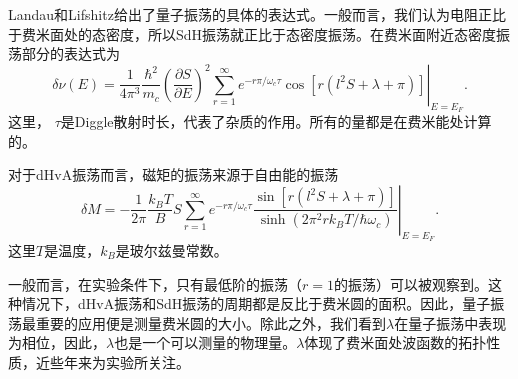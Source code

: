Landau和Lifshitz给出了量子振荡的具体的表达式。一般而言，我们认为电阻正比于费米面处的态密度，所以SdH振荡就正比于态密度振荡。在费米面附近态密度振荡部分的表达式为
\begin{equation}
\delta\nu (E) = \left. \frac{1}{4\pi^3}\frac{\hbar^2}{m_c}\left(\frac{\partial S}{\partial E}\right)^2\sum_{r=1}^{\infty} e^{-r\pi/\omega_c\tau}
\cos [r(l^2 S+\lambda+\pi)] \right|_{E=E_F}.
\end{equation}
这里， $\tau$是Diggle散射时长，代表了杂质的作用。所有的量都是在费米能处计算的。

对于dHvA振荡而言，磁矩的振荡来源于自由能的振荡
\begin{equation}
\delta M = \left. -\frac{1}{2\pi}\frac{k_B T}{B} S\sum_{r=1}^{\infty}e^{-r\pi/\omega_c\tau}\frac{\sin[r(l^2 S+\lambda+\pi)]}{\sinh(2\pi^2 r k_B T/\hbar \omega_c)}\right|_{E=E_F}.
\end{equation}
这里$T$是温度，$k_B$是玻尔兹曼常数。

一般而言，在实验条件下，只有最低阶的振荡（$r=1$的振荡）可以被观察到。这种情况下，dHvA振荡和SdH振荡的周期都是反比于费米圆的面积。因此，量子振荡最重要的应用便是测量费米圆的大小。除此之外，我们看到$\lambda$在量子振荡中表现为相位，因此，$\lambda$也是一个可以测量的物理量。$\lambda$体现了费米面处波函数的拓扑性质，近些年来为实验所关注。
